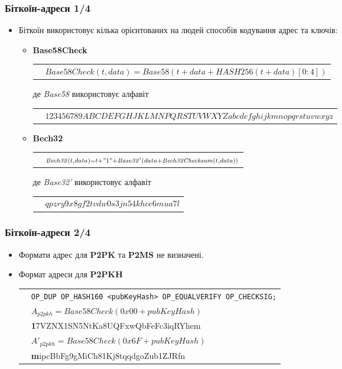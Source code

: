 \documentclass{beamer}
\begin{document}
\begin{frame}
  \frametitle{Біткоїн-адреси 1/4}
  \begin{itemize}
  \item Біткоїн використовує кілька орієнтованих на людей способів кодування
    адрес та ключів:
    \begin{itemize}
    \item \textbf{Base58Check} \break
      \begin{tabular}{rl}
        &${\scriptstyle \mathit{Base58Check}(t, data) = \mathit{Base58}(t + data + \mathit{HASH256}(t + data)[0:4])}$ \\
      \end{tabular}
      \break
      де \textit{Base58} використовує алфавіт
      \break
      \begin{tabular}{rl}
        &${\scriptstyle 123456789ABCDEFGHJKLMNPQRSTUVWXYZabcdefghijkmnopqrstuvwxyz}$ \\
      \end{tabular}
    \item \textbf{Bech32}
      \break
      \begin{tabular}{rl}
        &${\scriptstyle \mathit{Bech32}(t, data) = t + "1" + \mathit{Base32'}(data + \mathit{Bech32Checksum}(t, data))}$ \\
      \end{tabular}
      \break
      де \textit{Base32'} використовує алфавіт
      \break
      \begin{tabular}{rl}
        &${\scriptstyle qpzry9x8gf2tvdw0s3jn54khce6mua7l}$ \\
      \end{tabular}
    \end{itemize}
  \end{itemize}
\end{frame}

\begin{frame}
  \frametitle{Біткоїн-адреси 2/4}
  \begin{itemize}
  \item Формати адрес для \textbf{P2PK} та \textbf{P2MS} не визначені.
  \item Формат адреси для \textbf{P2PKH}
    \break
    \begin{tabular}{rl}
      &\tiny\texttt{OP_DUP OP_HASH160 <pubKeyHash>
        OP_EQUALVERIFY OP_CHECKSIG;} \\
      &${\scriptstyle A_{\mathit{p2pkh}} = \mathit{Base58Check}(0x00 +
        pubKeyHash)}$ \\
      &{\scriptsize \quad\quad\quad \textbf{1}7VZNX1SN5NtKa8UQFxwQbFeFc3iqRYhem} \\
      &${\scriptstyle A'_{\mathit{p2pkh}} = \mathit{Base58Check}(0x6F +
        pubKeyHash)}$ \\
      &{\scriptsize \quad\quad\quad \textbf{m}ipcBbFg9gMiCh81Kj8tqqdgoZub1ZJRfn} \\
    \end{tabular}
  \end{itemize}
\end{frame}
\end{document}
